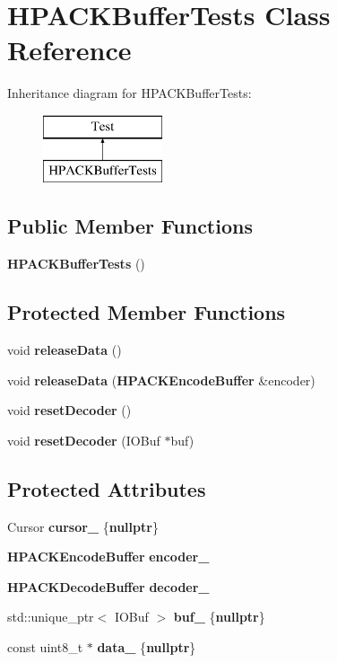 \section{H\+P\+A\+C\+K\+Buffer\+Tests Class Reference}
\label{classHPACKBufferTests}
Inheritance diagram for H\+P\+A\+C\+K\+Buffer\+Tests\+:\begin{figure}[H]
\begin{center}
\leavevmode
\includegraphics[height=2.000000cm]{classHPACKBufferTests}
\end{center}
\end{figure}
\subsection*{Public Member Functions}
\begin{DoxyCompactItemize}
\item 
{\bf H\+P\+A\+C\+K\+Buffer\+Tests} ()
\end{DoxyCompactItemize}
\subsection*{Protected Member Functions}
\begin{DoxyCompactItemize}
\item 
void {\bf release\+Data} ()
\item 
void {\bf release\+Data} ({\bf H\+P\+A\+C\+K\+Encode\+Buffer} \&encoder)
\item 
void {\bf reset\+Decoder} ()
\item 
void {\bf reset\+Decoder} (I\+O\+Buf $\ast$buf)
\end{DoxyCompactItemize}
\subsection*{Protected Attributes}
\begin{DoxyCompactItemize}
\item 
Cursor {\bf cursor\+\_\+} \{{\bf nullptr}\}
\item 
{\bf H\+P\+A\+C\+K\+Encode\+Buffer} {\bf encoder\+\_\+}
\item 
{\bf H\+P\+A\+C\+K\+Decode\+Buffer} {\bf decoder\+\_\+}
\item 
std\+::unique\+\_\+ptr$<$ I\+O\+Buf $>$ {\bf buf\+\_\+} \{{\bf nullptr}\}
\item 
const uint8\+\_\+t $\ast$ {\bf data\+\_\+} \{{\bf nullptr}\}
\end{DoxyCompactItemize}


